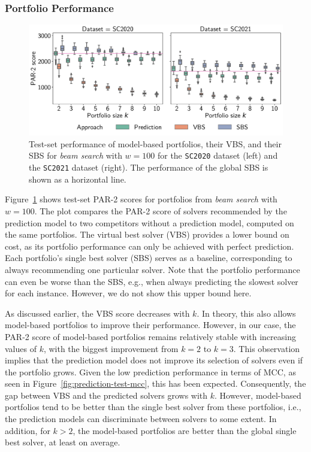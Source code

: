 \documentclass[a4paper,USenglish,pdfa]{lipics-v2021} %
\begin{document}
\subsubsection{Portfolio Performance}

\begin{figure}[tb]
	\centering
	\includegraphics[width=\columnwidth]{plots/prediction-test-objective-beam.pdf}
	\caption{
		Test-set performance of model-based portfolios, their VBS, and their SBS for \emph{beam search} with $w=100$ for the \texttt{SC2020} dataset (left) and the \texttt{SC2021} dataset (right).
		The performance of the global SBS is shown as a horizontal line.}
	\label{fig:prediction-test-objective-beam}
\end{figure}

Figure~\ref{fig:prediction-test-objective-beam} shows test-set PAR-2 scores for portfolios from \emph{beam search} with $w=100$.
The plot compares the PAR-2 score of solvers recommended by the prediction model to two competitors without a prediction model, computed on the same portfolios.
The virtual best solver (VBS) provides a lower bound on cost, as its portfolio performance can only be achieved with perfect prediction.
Each portfolio's single best solver (SBS) serves as a baseline, corresponding to always recommending one particular solver.
Note that the portfolio performance can even be worse than the SBS, e.g., when always predicting the slowest solver for each instance.
However, we do not show this upper bound here.

As discussed earlier, the VBS score decreases with $k$.
In theory, this also allows model-based portfolios to improve their performance.
However, in our case, the PAR-2 score of model-based portfolios remains relatively stable with increasing values of $k$, with the biggest improvement from $k=2$ to $k=3$.
This observation implies that the prediction model does not improve its selection of solvers even if the portfolio grows.
Given the low prediction performance in terms of MCC, as seen in Figure~\ref{fig:prediction-test-mcc}, this has been expected.
Consequently, the gap between VBS and the predicted solvers grows with $k$.
However, model-based portfolios tend to be better than the single best solver from these portfolios, i.e., the prediction models can discriminate between solvers to some extent.
In addition, for $k > 2$, the model-based portfolios are better than the global single best solver, at least on average.
\end{document}
